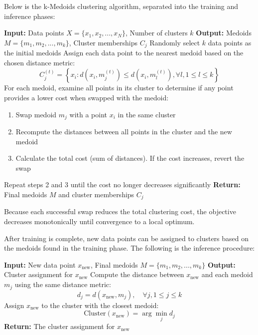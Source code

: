 \documentclass{article}
\begin{document}
Below is the k-Medoids clustering algorithm, separated into the training and inference phases:

\begin{algorithm}[H]
\caption{k-Medoids Clustering Algorithm (Training Phase)}
\begin{algorithmic}[1]
\State \textbf{Input:} Data points $X = \{x_1, x_2, ..., x_N\}$, Number of clusters $k$
\State \textbf{Output:} Medoids $M = \{m_1, m_2, ..., m_k\}$, Cluster memberships $C_j$
\State Randomly select $k$ data points as the initial medoids 
\Repeat
    \State Assign each data point to the nearest medoid based on the chosen distance metric:
    \[
    C_j^{(t)} = \left\{ x_i : d(x_i, m_j^{(t)}) \leq d(x_i, m_l^{(t)}), \forall l, 1 \leq l \leq k \right\}
    \]
    \State For each medoid, examine all points in its cluster to determine if any point provides a lower cost when swapped with the medoid:
    \begin{enumerate}
        \item Swap medoid $m_j$ with a point $x_i$ in the same cluster
        \item Recompute the distances between all points in the cluster and the new medoid
        \item Calculate the total cost (sum of distances). If the cost increases, revert the swap
    \end{enumerate}
    \State Repeat steps 2 and 3 until the cost no longer decreases significantly
\State \textbf{Return:} Final medoids $M$ and cluster memberships $C_j$
\end{algorithmic}
\end{algorithm}

Because each successful swap reduces the total clustering cost,
the objective decreases monotonically until convergence to a local optimum.

\noindent After training is complete, new data points can be assigned to clusters based on the medoids found in the training phase. The following is the inference procedure:

\begin{algorithm}[H]
\caption{k-Medoids Clustering Algorithm (Inference Phase)}
\begin{algorithmic}[1]
\State \textbf{Input:} New data point $x_{\text{new}}$, Final medoids $M = \{m_1, m_2, ..., m_k\}$
\State \textbf{Output:} Cluster assignment for $x_{\text{new}}$
\State Compute the distance between $x_{\text{new}}$ and each medoid $m_j$ using the same distance metric:
\[
d_j = d(x_{\text{new}}, m_j), \quad \forall j, 1 \leq j \leq k
\]
\State Assign $x_{\text{new}}$ to the cluster with the closest medoid:
\[
\text{Cluster}(x_{\text{new}}) = \arg \min_{j} d_j
\]
\State \textbf{Return:} The cluster assignment for $x_{\text{new}}$
\end{algorithmic}
\end{algorithm}
\end{document}
